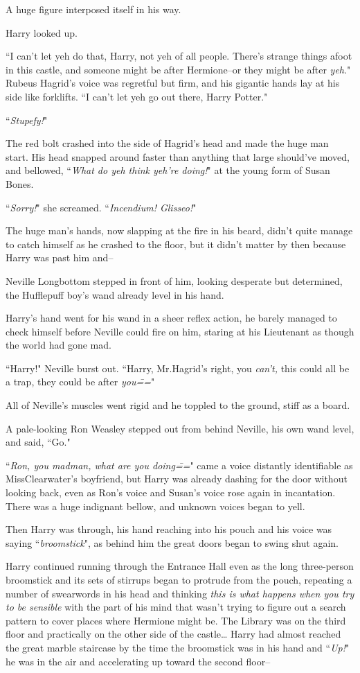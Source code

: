 A huge figure interposed itself in his way.

Harry looked up.

``I can't let yeh do that, Harry, not yeh of all people. There's strange things afoot in this castle, and someone might be after Hermione\---or they might be after \emph{yeh}." Rubeus Hagrid's voice was regretful but firm, and his gigantic hands lay at his side like forklifts. ``I can't let yeh go out there, Harry Potter."

``\emph{Stupefy!}"

The red bolt crashed into the side of Hagrid's head and made the huge man start. His head snapped around faster than anything that large should've moved, and bellowed, ``\emph{What do yeh think yeh're doing!}" at the young form of Susan Bones.

``\emph{Sorry!}" she screamed. ``\emph{Incendium! Glisseo!}"

The huge man's hands, now slapping at the fire in his beard, didn't quite manage to catch himself as he crashed to the floor, but it didn't matter by then because Harry was past him and\---

Neville Longbottom stepped in front of him, looking desperate but determined, the Hufflepuff boy's wand already level in his hand.

Harry's hand went for his wand in a sheer reflex action, he barely managed to check himself before Neville could fire on him, staring at his Lieutenant as though the world had gone mad.

``Harry!" Neville burst out. ``Harry, Mr.\?Hagrid's right, you \emph{can't,} this could all be a trap, they could be after \emph{you\===}"

All of Neville's muscles went rigid and he toppled to the ground, stiff as a board.

A pale-looking Ron Weasley stepped out from behind Neville, his own wand level, and said, ``Go."

``\emph{Ron, you madman, what are you doing\===}" came a voice distantly identifiable as Miss\?Clearwater's boyfriend, but Harry was already dashing for the door without looking back, even as Ron's voice and Susan's voice rose again in incantation. There was a huge indignant bellow, and unknown voices began to yell.

Then Harry was through, his hand reaching into his pouch and his voice was saying ``\emph{broomstick}", as behind him the great doors began to swing shut again.

Harry continued running through the Entrance Hall even as the long three-person broomstick and its sets of stirrups began to protrude from the pouch, repeating a number of swearwords in his head and thinking \emph{this is what happens when you try to be sensible} with the part of his mind that wasn't trying to figure out a search pattern to cover places where Hermione might be. The Library was on the third floor and practically on the other side of the castle{\ldots} Harry had almost reached the great marble staircase by the time the broomstick was in his hand and ``\emph{Up!}" he was in the air and accelerating up toward the second floor\---

